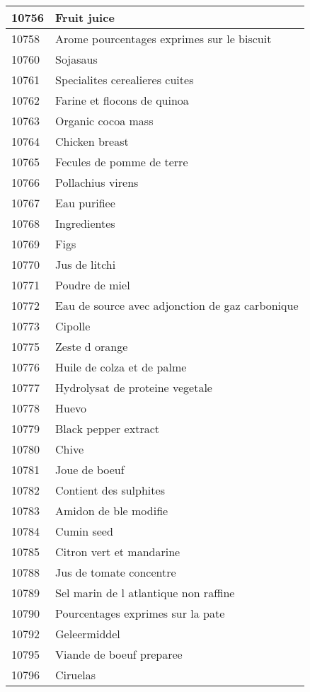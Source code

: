 \begin{longtable}{|l|l|}
10756 & Fruit juice \\ \hline 
10758 & Arome  pourcentages exprimes sur le biscuit \\ \hline 
10760 & Sojasaus \\ \hline 
10761 & Specialites cerealieres cuites \\ \hline 
10762 & Farine et flocons de quinoa \\ \hline 
10763 & Organic cocoa mass \\ \hline 
10764 & Chicken breast \\ \hline 
10765 & Fecules de pomme de terre \\ \hline 
10766 & Pollachius virens \\ \hline 
10767 & Eau purifiee \\ \hline 
10768 & Ingredientes \\ \hline 
10769 & Figs \\ \hline 
10770 & Jus de litchi \\ \hline 
10771 & Poudre de miel \\ \hline 
10772 & Eau de source avec adjonction de gaz carbonique \\ \hline 
10773 & Cipolle \\ \hline 
10775 & Zeste d orange \\ \hline 
10776 & Huile de colza et de palme \\ \hline 
10777 & Hydrolysat de proteine vegetale \\ \hline 
10778 & Huevo \\ \hline 
10779 & Black pepper extract \\ \hline 
10780 & Chive \\ \hline 
10781 & Joue de boeuf \\ \hline 
10782 & Contient des sulphites \\ \hline 
10783 & Amidon de ble modifie \\ \hline 
10784 & Cumin seed \\ \hline 
10785 & Citron vert et mandarine \\ \hline 
10788 & Jus de tomate concentre \\ \hline 
10789 & Sel marin de l atlantique non raffine \\ \hline 
10790 & Pourcentages exprimes sur la pate \\ \hline 
10792 & Geleermiddel \\ \hline 
10795 & Viande de boeuf preparee \\ \hline 
10796 & Ciruelas \\ \hline 

\end{longtable}
